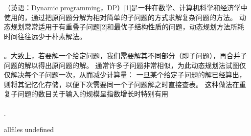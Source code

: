 \documentclass{article}
\begin{document}
\begin{CJK}{UTF8}{gbsn}     %

\else

（英语：Dynamic programming，DP）[1]是一种在数学、计算机科学和经济学中使用的，通过把原问题分解为相对简单的子问题的方式求解复杂问题的方法。 动态规划常常适用于有重叠子问题[2]和最优子结构性质的问题，动态规划方法所耗时间往往远少于朴素解法。\\
\\
。大致上，若要解一个给定问题，我们需要解其不同部分（即子问题），再合并子问题的解以得出原问题的解。 通常许多子问题非常相似，为此动态规划法试图仅仅解决每个子问题一次，从而减少计算量： 一旦某个给定子问题的解已经算出，则将其记忆化存储，以便下次需要同一个子问题解之时直接查表。 这种做法在重复子问题的数目关于输入的规模呈指数增长时特别有用\\
\\
.
\fi

\ifx allfiles undefined
\end{CJK}
\end{document}
